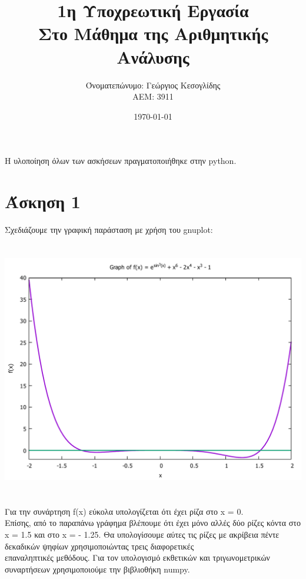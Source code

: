 \documentclass[a4paper,11pt]{article}
\title{1η Υποχρεωτική Εργασία \\ Στο Μάθημα της Αριθμητικής Ανάλυσης}
\author{Όνοματεπώνυμο: Γεώργιος Κεσογλίδης  \\  ΑΕΜ: 3911}
\date{\today}
\newcommand{\lt}{\latintext}
\newcommand{\gt}{\greektext}
\begin{document}
\maketitle
\normalsize{
H υλοποίηση όλων των ασκήσεων πραγματοποιήθηκε στην \lt python.}

\section{Άσκηση 1}
\vspace*{0 cm}
\normalsize{
Σχεδιάζουμε την γραφική παράσταση με χρήση του \lt gnuplot:}
\\
\hspace*{-1 cm}
\includegraphics[height=12cm, width=15cm]{Ask1.pdf}
\newpage
\normalsize{	Για την συνάρτηση  \lt f(x) \gt εύκολα 	
υπολογίζεται ότι έχει ρίζα στο \lt x = 0. \gt 
\\ Επίσης, από το παραπάνω
γράφημα βλέπουμε ότι έχει μόνο αλλές δύο ρίζες κόντα στο \lt x = 1.5
\gt και στο \lt x = - 1.25. \gt Θα υπολογίσουμε αύτες τις ρίζες με
ακρίβεια πέντε δεκαδικών ψηφίων χρησιμοποιώντας τρεις διαφορετικές
\\επαναληπτικές μεθόδους. Για τον υπολογισμό εκθετικών και
τριγωνομετρικών συναρτήσεων χρησιμοποιούμε την βιβλιοθήκη \lt numpy.}
\end{document}
